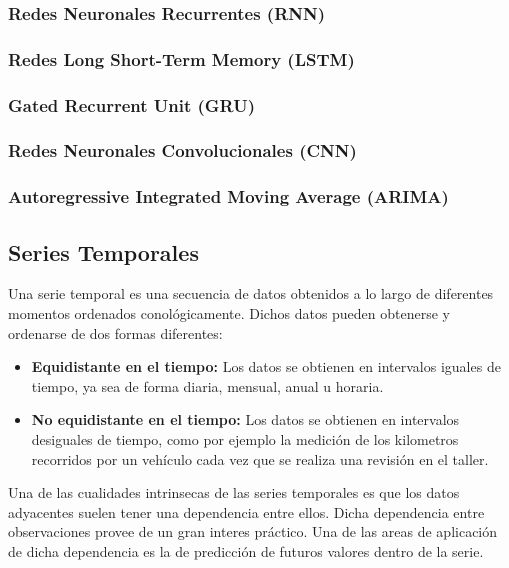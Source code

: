 \documentclass[a4paper,12pt]{article}
\begin{document}
\subsubsection{Redes Neuronales Recurrentes (RNN)}

\subsubsection{Redes Long Short-Term Memory (LSTM)}

\subsubsection{Gated Recurrent Unit (GRU)}

\subsubsection{Redes Neuronales Convolucionales (CNN)}

\subsubsection{Autoregressive Integrated Moving Average (ARIMA)}


\subsection{Series Temporales}

Una serie temporal es una secuencia de datos obtenidos
a lo largo de diferentes momentos ordenados conológicamente.
Dichos datos pueden obtenerse y ordenarse de dos formas diferentes:

\begin{itemize}
    \item \textbf{Equidistante en el tiempo:} Los datos se 
    obtienen en intervalos iguales de tiempo, ya sea de forma
    diaria, mensual, anual u horaria.

    \item \textbf{No equidistante en el tiempo:} Los datos 
    se obtienen en intervalos desiguales de tiempo, como 
    por ejemplo la medición de los kilometros recorridos por 
    un vehículo cada vez que se realiza una revisión en el 
    taller.
\end{itemize}

Una de las cualidades intrinsecas de las series temporales es 
que los datos adyacentes suelen tener una dependencia entre 
ellos. Dicha dependencia entre observaciones provee de un 
gran interes práctico. Una de las areas de aplicación de 
dicha dependencia es la de predicción de futuros valores dentro 
de la serie.
\end{document}
